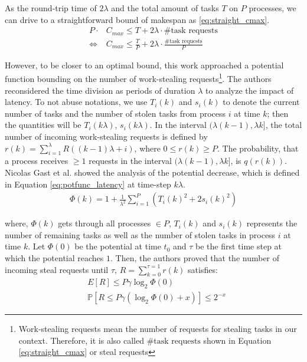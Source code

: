 As the round-trip time of $2\lambda$ and the total amount of tasks $T$ on $P$ processes, we can drive to a straightforward bound of makespan as \ref{eq:straight_cmax}.
\begin{equation} \label{eq:straight_cmax}
\begin{split}
	P \cdot & C_{max} \leq T + 2\lambda \cdot \#{\textrm{task requests}} \\
	\Leftrightarrow \ & C_{max} \leq \frac{T}{P} + 2\lambda \cdot \frac{\#{\textrm{task requests}}}{P}
\end{split}
\end{equation}

However, to be closer to an optimal bound, this work approached a potential function bounding on the number of work-stealing requests\footnote{Work-stealing requests mean the number of requests for stealing tasks in our context. Therefore, it is also called $\#{\textrm{task requests}}$ shown in Equation \ref{eq:straight_cmax} or steal requests}. The authors reconsidered the time division as periods of duration $\lambda$ to analyze the impact of latency. To not abuse notations, we use $T_{i}(k)$ and $s_{i}(k)$ to denote the current number of tasks and the number of stolen tasks from process $i$ at time $k$; then the quantities will be $T_{i}(k\lambda)$, $s_{i}(k\lambda)$. In the interval $(\lambda (k-1), \lambda k]$, the total number of incoming work-stealing requests is defined by $r(k) = \sum_{i=1}^{\lambda} R((k-1)\lambda + i)$, where $0 \leq r(k) \geq P$. The probability, that a process receives $\geq 1$ requests in the interval $(\lambda (k-1), \lambda k]$, is $q(r(k))$.\\

Nicolas Gast et al. \cite{gast2021analysis} showed the analysis of the potential decrease, which is defined in Equation \ref{eq:potfunc_latency} at time-step $k\lambda$.
\begin{equation} \label{eq:potfunc_latency}
\begin{split}
	\Phi(k) = 1 + \frac{1}{\lambda^2} \sum_{i=1}^{P} (T_{i}(k)^2 + 2s_{i}(k)^2)
\end{split}
\end{equation}

where, $\Phi(k)$ gets through all processes $\in P$, $T_{i}(k)$ and $s_{i}(k)$ represents the number of remaining tasks as well as the number of stolen tasks in process $i$ at time $k$. Let $\Phi(0)$ be the potential at time $t_{0}$ and $\tau$ be the first time step at which the potential reaches $1$. Then, the authors proved that the number of incoming steal requests until $\tau$, $R = \sum_{k=0}^{\tau = 1} r(k)$ satisfies:
\begin{equation} \label{eq:exp_prob_R_latency}
\begin{split}
	& E[R] \leq P \gamma \log_{2} \Phi(0) \\
	& \mathbb{P}[R \leq P \gamma (\log_{2} \Phi(0) + x)] \leq 2^{-x}
\end{split}
\end{equation}

